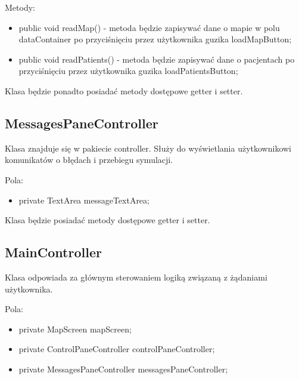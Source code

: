 \documentclass{article}
\begin{document}
    Metody:
    \begin{itemize}
        \item public void readMap() - metoda będzie zapisywać dane o mapie w polu dataContainer po przyciśnięciu przez użytkownika guzika loadMapButton;
        \item public void readPatients() - metoda będzie zapisywać dane o pacjentach po przyciśnięciu przez użytkownika guzika loadPatientsButton;
    \end{itemize}
    Klasa będzie ponadto posiadać metody dostępowe getter i setter.

    \subsection{MessagesPaneController}
     Klasa znajduje się w pakiecie controller. Służy do wyświetlania użytkownikowi komunikatów o błędach i przebiegu symulacji.

     Pola:
     \begin{itemize}
        \item private TextArea messageTextArea;
     \end{itemize}
     Klasa będzie posiadać metody dostępowe getter i setter.

    \subsection{MainController}
    Klasa odpowiada za głównym sterowaniem logiką związaną z żądaniami użytkownika.

    Pola:
    \begin{itemize}
        \item private MapScreen mapScreen;
        \item private ControlPaneController controlPaneController;
        \item private MessagesPaneController messagesPaneController;
    \end{itemize}
\end{document}
